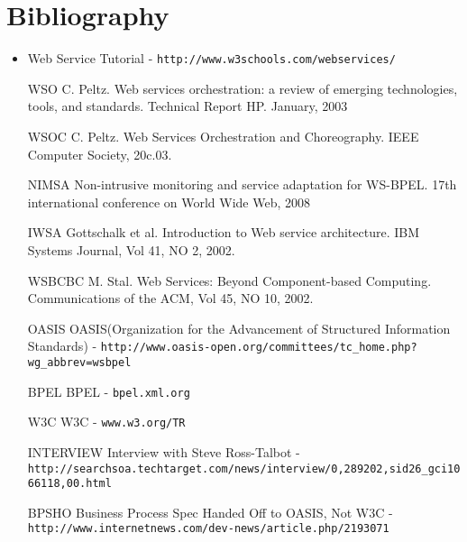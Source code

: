 \documentclass[12pt,a4paper]{article}
\begin{document}
\section{Bibliography}
\begin{itemize}
\item Web Service Tutorial - \verb!http://www.w3schools.com/webservices/!

\item[WSO] C. Peltz. Web services orchestration: a review of emerging technologies, tools, and standards. Technical Report HP. January, 2003

\item[WSOC] C. Peltz. Web Services Orchestration and Choreography. IEEE Computer Society, 20c.03.

\item[NIMSA] Non-intrusive monitoring and service adaptation for WS-BPEL. 17th international conference on World Wide Web, 2008

\item[IWSA] Gottschalk et al. Introduction to Web service architecture. IBM Systems Journal, Vol 41, NO 2, 2002.

\item[WSBCBC] M. Stal. Web Services: Beyond Component-based Computing. Communications of the ACM, Vol 45, NO 10, 2002.

\item[OASIS] OASIS(Organization for the Advancement of Structured Information Standards) - \verb!http://www.oasis-open.org/committees/tc_home.php?wg_abbrev=wsbpel!

\item[BPEL] BPEL - \verb!bpel.xml.org!

\item[W3C] W3C - \verb!www.w3.org/TR!

\item[INTERVIEW] Interview with Steve Ross-Talbot - \verb!http://searchsoa.techtarget.com/news/interview/0,289202,sid26_gci1066118,00.html!

\item[BPSHO] Business Process Spec Handed Off to OASIS, Not W3C - \verb!http://www.internetnews.com/dev-news/article.php/2193071!

\end{itemize}
\end{document}
